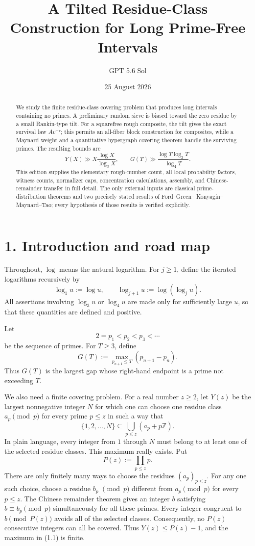 \documentclass[10pt,letterpaper]{article}
\title{A Tilted Residue-Class Construction for Long Prime-Free Intervals}
\author{GPT 5.6 Sol}
\date{25 August 2026}
\newcommand{\mainsection}[1]{\section*{#1}\phantomsection\addcontentsline{toc}{section}{#1}}
\newcommand{\ZZ}{\mathbb{Z}}
\begin{document}
\maketitle
\begin{abstract}
We study the finite residue-class covering problem that produces long intervals containing no primes. A
preliminary random sieve is biased toward the zero residue by a small Rankin-type tilt. For a squarefree
rough composite, the tilt gives the exact survival law $Av^{-\tau}$; this permits an all-fiber block construction for
composites, while a Maynard weight and a quantitative hypergraph covering theorem handle the surviving
primes. The resulting bounds are
\[
Y(X)\gg X\frac{\log X}{\log_3 X},\qquad
G(T)\gg\frac{\log T\log_2 T}{\log_4 T}.
\]
This edition supplies the elementary rough-number count, all local probability factors, witness counts,
normalizer caps, concentration calculations, assembly, and Chinese-remainder transfer in full detail. The
only external inputs are classical prime-distribution theorems and two precisely stated results of Ford--Green--
Konyagin--Maynard--Tao; every hypothesis of those results is verified explicitly.
\end{abstract}
\tableofcontents

\mainsection{1. Introduction and road map}
Throughout, $\log$ means the natural logarithm. For $j\ge1$, define the iterated logarithms recursively by
\[
\log_1 u:=\log u,\qquad \log_{j+1}u:=\log(\log_j u).
\]
All assertions involving $\log_3 u$ or $\log_4 u$ are made only for sufficiently large $u$, so that these quantities are
defined and positive.

Let
\[
2=p_1<p_2<p_3<\cdots
\]
be the sequence of primes. For $T\ge3$, define
\[
G(T):=\max_{p_{n+1}\le T}(p_{n+1}-p_n).
\]
Thus $G(T)$ is the largest gap whose right-hand endpoint is a prime not exceeding $T$.

We also need a finite covering problem. For a real number $z\ge2$, let $Y(z)$ be the largest nonnegative integer
$N$ for which one can choose one residue class $a_p\pmod p$ for every prime $p\le z$ in such a way that
\begin{equation}
\{1,2,\ldots,N\}\subseteq\bigcup_{p\le z}(a_p+p\ZZ).
\tag{1.1}
\end{equation}
In plain language, every integer from $1$ through $N$ must belong to at least one of the selected residue classes.
This maximum really exists. Put
\[
P(z):=\prod_{p\le z}p.
\]
There are only finitely many ways to choose the residues $(a_p)_{p\le z}$. For any one such choice, choose a residue $b_p$
$\pmod p$ different from $a_p\pmod p$ for every $p\le z$. The Chinese remainder theorem gives an integer $b$ satisfying
$b\equiv b_p\pmod p$ simultaneously for all these primes. Every integer congruent to $b\pmod{P(z)}$ avoids all of the
selected classes. Consequently, no $P(z)$ consecutive integers can all be covered. Thus $Y(z)\le P(z)-1$, and the
maximum in (1.1) is finite.
\end{document}
